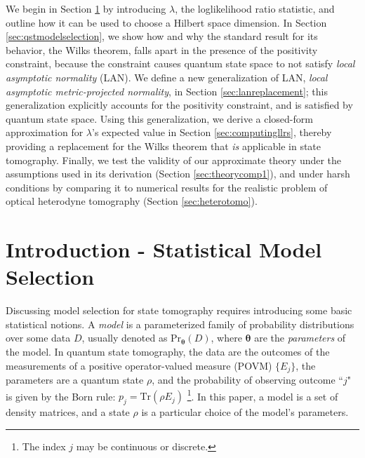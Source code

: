 \documentclass[aps,pra, twocolumn]{revtex4-1}
\newcommand{\bs}[1]{\boldsymbol{#1}}
\begin{document}
We begin in Section \ref{sec:intro} by introducing $\lambda$, the loglikelihood ratio statistic, and outline how it can be used to choose a Hilbert space dimension.  In Section \ref{sec:qstmodelselection}, we show how and why the standard result for its behavior, the Wilks theorem, falls apart in the presence of the positivity constraint, because the constraint causes quantum state space to not satisfy \emph{local asymptotic normality} (LAN).  We define a new generalization of LAN, \emph{local asymptotic metric-projected normality}, in Section \ref{sec:lanreplacement}; this generalization explicitly accounts for the positivity constraint, and is satisfied by quantum state space. Using this generalization, we derive a closed-form approximation for $\lambda$'s expected value in Section \ref{sec:computingllrs}, thereby providing a replacement for the Wilks theorem that \emph{is} applicable in state tomography.  Finally, we test the validity of our approximate theory under the assumptions used in its derivation (Section \ref{sec:theorycomp1}), and under harsh conditions by comparing it to numerical results for the realistic problem of optical heterodyne tomography (Section \ref{sec:heterotomo}).

\section{Introduction - Statistical Model Selection}
\label{sec:intro}
Discussing model selection for state tomography requires introducing some basic statistical notions.  A \emph{model} is a parameterized family of probability distributions over some data $D$, usually denoted as $\mathrm{Pr}_{\bs{\theta}}(D)$, where $\bs{\theta}$ are the \emph{parameters} of the model. In quantum state tomography, the data are the outcomes of the measurements of a positive operator-valued measure (POVM) $\{E_{j}\}$, the parameters are a quantum state $\rho$, and the probability of observing outcome ``$j$" is given by the Born rule: $p_{j} = \mathrm{Tr}(\rho E_{j})$ \footnote{The index $j$ may be continuous or discrete.}. In this paper, a model is a set of density matrices, and a state $\rho$ is a particular choice of the model's parameters.
\end{document}
